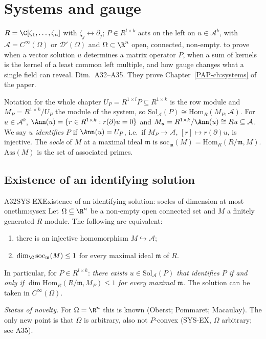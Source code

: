 \chapter[Systems and gauge]{Systems and gauge}\label{ch:cIII1}
\chapterbrief
{$R=\C[\zeta_1,\dots,\zeta_n]$ with $\zeta_j\leftrightarrow\partial_j$; $P\in R^{l\times k}$ acts on the left on $u\in\mathcal A^k$, with $\mathcal A=C^\infty(\Omega)$ or $\mathcal D'(\Omega)$ and $\Omega\subset\R^n$ open, connected, non-empty.}
{to prove when a vector solution $u$ determines a matrix operator $P$, when a sum of kernels is the kernel of a least common left multiple, and how gauge changes what a single field can reveal.}
{Dim.~A32--A35. They prove Chapter~\ref{PAP-ch:systems} of the paper.}

\begin{notebox}{Notation for the whole chapter}
$U_P=R^{1\times l}P\subseteq R^{1\times k}$ is the row module and $M_P=R^{1\times k}/U_P$ the module of the system, so $\mathrm{Sol}_{\mathcal A}(P)\cong\mathrm{Hom}_R(M_P,\mathcal A)$. For $u\in\mathcal A^k$, $\Ann(u)=\{r\in R^{1\times k}: r(\partial)u=0\}$ and $M_u=R^{1\times k}/\Ann(u)\cong R u\subseteq\mathcal A$. We say \emph{$u$ identifies $P$} if $\Ann(u)=U_P$, i.e.\ if $M_P\to\mathcal A$, $[r]\mapsto r(\partial)u$, is injective. The \emph{socle} of $M$ at a maximal ideal $\mathfrak m$ is $\mathrm{soc}_{\mathfrak m}(M)=\mathrm{Hom}_R(R/\mathfrak m,M)$. $\mathrm{Ass}(M)$ is the set of associated primes.
\end{notebox}

\section{Existence of an identifying solution}

\begin{dimcard}{A32}{SYS-EX}{Existence of an identifying solution: socles of dimension at most one}{\proved}{thm:sysex}
Let $\Omega\subseteq\R^n$ be a non-empty open connected set and $M$ a finitely generated $R$-module. The following are equivalent:
\begin{enumerate}[label=(\roman*)]
\item there is an injective homomorphism $M\hookrightarrow\mathcal A$;
\item $\dim_\C\mathrm{soc}_{\mathfrak m}(M)\le1$ for every maximal ideal $\mathfrak m$ of $R$.
\end{enumerate}
In particular, for $P\in R^{l\times k}$: \emph{there exists $u\in\mathrm{Sol}_{\mathcal A}(P)$ that identifies $P$ if and only if $\dim\mathrm{Hom}_R(R/\mathfrak m,M_P)\le1$ for every maximal $\mathfrak m$.} The solution can be taken in $C^\infty(\Omega)$.

\emph{Status of novelty.} For $\Omega=\R^n$ this is known (Oberst; Pommaret; Macaulay). The only new point is that $\Omega$ is arbitrary, also not $P$-convex (SYS-EX, $\Omega$ arbitrary; see A35).
\end{dimcard}

